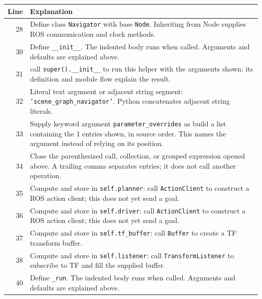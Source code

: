 \documentclass[11pt,a4paper]{book}
\begin{document}
\begin{longtable}{r p{}}

\textbf{Line} & \textbf{Explanation} \\ \hline \endhead

28 & Define class \texttt{Navigator} with base \texttt{Node}. Inheriting from Node supplies ROS communication and clock methods. \\

30 & Define \texttt{\_\_init\_\_}. The indented body runs when called. Arguments and defaults are explained above. \\

31 & call \texttt{super().\_\_init\_\_} to run this helper with the arguments shown; its definition and module flow explain the result. \\

32 & Literal text argument or adjacent string segment: \texttt{'scene\_graph\_navigator'}. Python concatenates adjacent string literals. \\

33 & Supply keyword argument \texttt{parameter\_overrides} as build a list containing the 1 entries shown, in source order. This names the argument instead of relying on its position. \\

34 & Close the parenthesized call, collection, or grouped expression opened above. A trailing comma separates entries; it does not call another operation. \\

35 & Compute and store in \texttt{self.planner}: call \texttt{ActionClient} to construct a ROS action client; this does not yet send a goal.  \\

36 & Compute and store in \texttt{self.driver}: call \texttt{ActionClient} to construct a ROS action client; this does not yet send a goal.  \\

37 & Compute and store in \texttt{self.tf\_buffer}: call \texttt{Buffer} to create a TF transform buffer.  \\

38 & Compute and store in \texttt{self.listener}: call \texttt{TransformListener} to subscribe to TF and fill the supplied buffer.  \\

40 & Define \texttt{\_run}. The indented body runs when called. Arguments and defaults are explained above. \\


\end{longtable}
\end{document}
